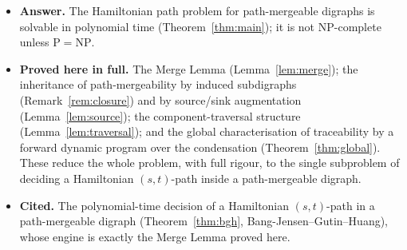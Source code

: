 \documentclass[12pt]{article}
\theoremstyle{definition}
\begin{document}
\begin{itemize}
\item \textbf{Answer.} The Hamiltonian path problem for path-mergeable digraphs is
solvable in polynomial time (Theorem~\ref{thm:main}); it is not NP-complete unless
$\mathrm{P}=\mathrm{NP}$.
\item \textbf{Proved here in full.} The Merge Lemma (Lemma~\ref{lem:merge}); the
inheritance of path-mergeability by induced subdigraphs (Remark~\ref{rem:closure})
and by source/sink augmentation (Lemma~\ref{lem:source}); the component-traversal
structure (Lemma~\ref{lem:traversal}); and the global characterisation of
traceability by a forward dynamic program over the condensation
(Theorem~\ref{thm:global}). These reduce the whole problem, with full rigour, to
the single subproblem of deciding a Hamiltonian $(s,t)$-path inside a
path-mergeable digraph.
\item \textbf{Cited.} The polynomial-time decision of a Hamiltonian $(s,t)$-path in
a path-mergeable digraph (Theorem~\ref{thm:bgh}, Bang-Jensen--Gutin--Huang), whose
engine is exactly the Merge Lemma proved here.
\end{itemize}
\end{document}
